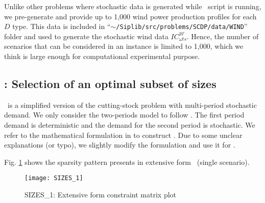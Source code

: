 Unlike other problems where stochastic data is generated while \julia\ script is running, we pre-generate and provide up to 1,000 wind power production profiles for each $D$ type. This data is included in ``\texttt{$\sim$/Siplib/src/problems/SCDP/data/WIND}'' folder and used to generate the stochastic wind data $IC_{\omega ts}^\mathcal{W}$. Hence, the number of scenarios that can be considered in an instance is limited to 1,000, which we think is large enough for computational experimental purpose.

\subsection{\sizes: Selection of an optimal subset of sizes} \label{SIZES}
\sizes\ is a simplified version of the cutting-stock problem with multi-period stochastic demand. We only consider the two-periods model to follow \cite{journal:JSW1999}. The first period demand is deterministic and the demand for the second period is stochastic. We refer to the mathematical formulation in \cite{journal:JSW1999} to construct \jumpmodel. Due to some unclear explanations (or typo), we slightly modify the formulation and use it for \siplibtwo.


Fig. \ref{fig:sizes_sparsity} shows the sparsity pattern presents in extensive form \sizes\ (single scenario).
\begin{figure}[H]
	\centering
	\texttt{[image: SIZES\_1]}
	\caption{SIZES\_1: Extensive form constraint matrix plot}
	\label{fig:sizes_sparsity}
\end{figure}

